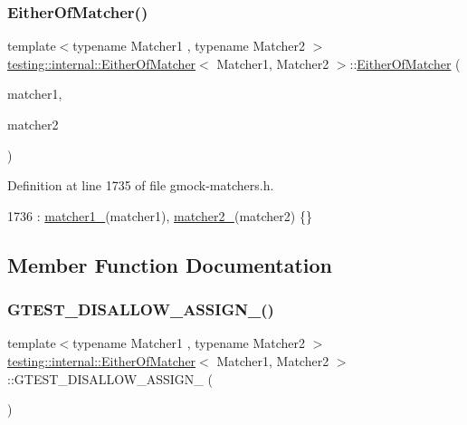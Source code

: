 \subsubsection{\texorpdfstring{Either\+Of\+Matcher()}{EitherOfMatcher()}}
{\footnotesize\ttfamily template$<$typename Matcher1 , typename Matcher2 $>$ \\
\hyperlink{classtesting_1_1internal_1_1EitherOfMatcher}{testing\+::internal\+::\+Either\+Of\+Matcher}$<$ Matcher1, Matcher2 $>$\+::\hyperlink{classtesting_1_1internal_1_1EitherOfMatcher}{Either\+Of\+Matcher} (\begin{DoxyParamCaption}\item[{Matcher1}]{matcher1,  }\item[{Matcher2}]{matcher2 }\end{DoxyParamCaption})\hspace{0.3cm}{\ttfamily [inline]}}



Definition at line 1735 of file gmock-\/matchers.\+h.


\begin{DoxyCode}
1736       : \hyperlink{classtesting_1_1internal_1_1EitherOfMatcher_a335b19a187644e6057f0046a2e6949cf}{matcher1\_}(matcher1), \hyperlink{classtesting_1_1internal_1_1EitherOfMatcher_a4c8a80860b5748dfb764744a8aae6a90}{matcher2\_}(matcher2) \{\}
\end{DoxyCode}


\subsection{Member Function Documentation}
\mbox{\label{classtesting_1_1internal_1_1EitherOfMatcher_ae9309360587fde1e8dee4ed4a1bfebd3}} 
\subsubsection{\texorpdfstring{G\+T\+E\+S\+T\+\_\+\+D\+I\+S\+A\+L\+L\+O\+W\+\_\+\+A\+S\+S\+I\+G\+N\+\_\+()}{GTEST\_DISALLOW\_ASSIGN\_()}}
{\footnotesize\ttfamily template$<$typename Matcher1 , typename Matcher2 $>$ \\
\hyperlink{classtesting_1_1internal_1_1EitherOfMatcher}{testing\+::internal\+::\+Either\+Of\+Matcher}$<$ Matcher1, Matcher2 $>$\+::G\+T\+E\+S\+T\+\_\+\+D\+I\+S\+A\+L\+L\+O\+W\+\_\+\+A\+S\+S\+I\+G\+N\+\_\+ (\begin{DoxyParamCaption}\item[{\hyperlink{classtesting_1_1internal_1_1EitherOfMatcher}{Either\+Of\+Matcher}$<$ Matcher1, Matcher2 $>$}]{ }\end{DoxyParamCaption})\hspace{0.3cm}{\ttfamily [private]}}

